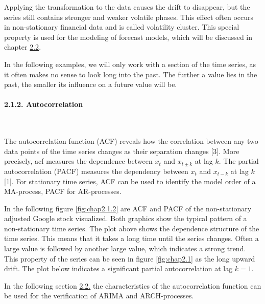 \documentclass[
]{article}
\begin{document}
Applying the transformation to the data causes the drift to disappear,
but the series still contains stronger and weaker volatile phases. This
effect often occurs in non-stationary financial data and is called
volatility cluster. This special property is used for the modeling of
forecast models, which will be discussed in chapter
\protect\hyperlink{models-section}{2.2}.

In the following examples, we will only work with a section of the time
series, as it often makes no sense to look long into the past. The
further a value lies in the past, the smaller its influence on a future
value will be.

\hypertarget{autocorrelation}{%
\paragraph{2.1.2. Autocorrelation}\label{autocorrelation}}

~

The autocorrelation function (ACF) reveals how the correlation between
any two data points of the time series changes as their separation
changes {[}3{]}. More precisely, acf measures the dependence between
\(x_{t}\) and \(x_{t \pm k}\) at lag \(k\). The partial autocorrelation
(PACF) measures the dependency between \(x_{t}\) and \(x_{t-k}\) at lag
\(k\) {[}1{]}. For stationary time series, ACF can be used to identify
the model order of a MA-process, PACF for AR-processes.

In the following figure \ref{fig:chap2.1.2} are ACF and PACF of the
non-stationary adjusted Google stock visualized. Both graphics show the
typical pattern of a non-stationary time series. The plot above shows
the dependence structure of the time series. This means that it takes a
long time until the series changes. Often a large value is followed by
another large value, which indicates a strong trend. This property of
the series can be seen in figure \ref{fig:chap2.1} as the long upward
drift. The plot below indicates a significant partial autocorrelation at
lag \(k=1\).

In the following section \protect\hyperlink{models-section}{2.2.} the
characteristics of the autocorrelation function can be used for the
verification of ARIMA and ARCH-processes.
\end{document}
